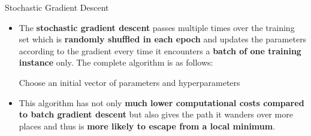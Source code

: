 \documentclass[document.tex]{subfiles}
\begin{document}
    \begin{frame}{Stochastic Gradient Descent}
        \begin{itemize}
            \item The \textbf{stochastic gradient descent} passes multiple times over the training set which is \textbf{randomly shuffled in each epoch} and updates the parameters according to the gradient every time it encounters a \textbf{batch of one training instance} only. The complete algorithm is as follows:
            
            \begin{center}
                \begin{minipage}{.9\linewidth}
                    \begin{algorithm}[H]
                        \DontPrintSemicolon
                        \caption{Stochastic Gradient Descent}
                        Choose an initial vector of parameters and hyperparameters\;
                    \end{algorithm}
                \end{minipage}
            \end{center}
        
            \vspace*{2mm}
            \item This algorithm has not only \textbf{much lower computational costs compared to batch gradient descent} but also gives the path it wanders over more places and thus is \textbf{more likely to escape from a local minimum}.
        \end{itemize}
    \end{frame}	
\end{document}
